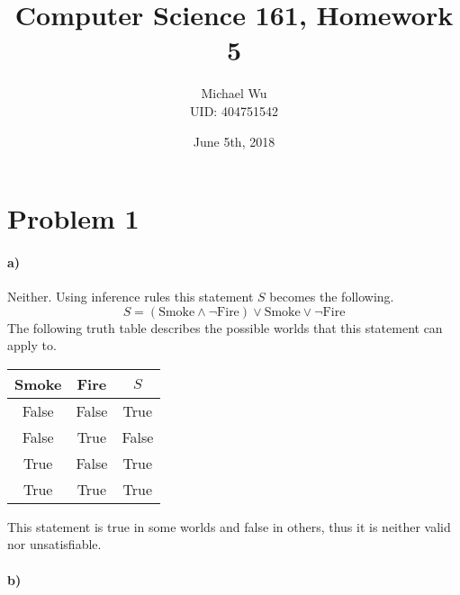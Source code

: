\documentclass[12pt]{article}
\begin{document}
\title{Computer Science 161, Homework 5}
\date{June 5th, 2018}
\author{Michael Wu\\UID: 404751542}
\maketitle

\section*{Problem 1}

\paragraph{a)}

Neither. Using inference rules this statement \(S\) becomes the following.
\[S=(\text{Smoke}\land\neg\text{Fire})\lor\text{Smoke}\lor\neg\text{Fire}\]
The following truth table describes the possible worlds that this statement can apply to.
\begin{center}
        \begin{tabular}{c|c|c}
                Smoke & Fire & \(S\)\\
                \hline
                False & False & True\\
                False & True & False\\
                True & False & True\\
                True & True & True
        \end{tabular}
\end{center}
This statement is true in some worlds and false in others, thus it is neither valid nor unsatisfiable.

\paragraph{b)}
\end{document}
